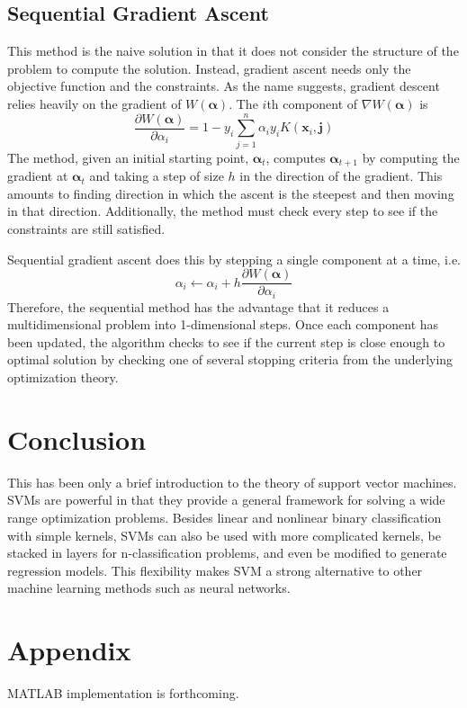 \documentclass{article}
\newcommand{\balpha}{\bm{\alpha}}
\begin{document}
\subsection{Sequential Gradient Ascent}
This method is the naive solution in that it does not consider the structure of the problem to compute the solution. Instead, gradient ascent needs only the objective function and the constraints. As the name suggests, gradient descent relies heavily on the gradient of $W(\balpha)$. The $i$th component of $\nabla W(\balpha)$ is 
$$ \frac{\partial W(\balpha)}{\partial \alpha_i} = 1 - y_i \sum_{j=1}^n \alpha_i y_i K(\mathbf{x}_i, \mathbf{j} ) $$
The method, given an initial starting point, $\balpha_t$, computes $\balpha_{t+1}$ by computing the gradient at $\balpha_t$ and taking a step of size $h$ in the direction of the gradient. This amounts to finding direction in which the ascent is the steepest and then moving in that direction. Additionally, the method must check every step to see if the constraints are still satisfied.

Sequential gradient ascent does this by stepping a single component at a time, i.e.
$$ \alpha_i \leftarrow  \alpha_i +h \frac{\partial W(\balpha)}{\partial \alpha_i}$$
Therefore, the sequential method has the advantage that it reduces a multidimensional problem into 1-dimensional steps. Once each component has been updated, the algorithm checks to see if the current step is close enough to optimal solution by checking one of several stopping criteria from the underlying optimization theory.  

\section{Conclusion}
This has been only a brief introduction to the theory of support vector machines. SVMs are powerful in that they provide a general framework for solving a wide range optimization problems. Besides linear and nonlinear binary classification with simple kernels, SVMs can also be used with more complicated kernels, be stacked in layers for n-classification problems, and even be modified to generate  regression models. This flexibility makes SVM a strong alternative to other machine learning methods such as neural networks.

\pagebreak
\section{Appendix}
MATLAB implementation is forthcoming.
\end{document}
